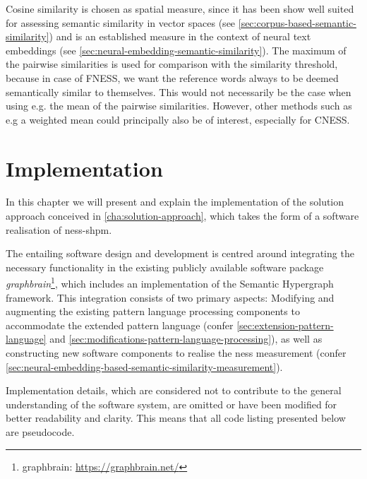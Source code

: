 \documentclass[11pt, numbers=noenddot]{scrreprt}
\begin{document}

Cosine similarity is chosen as spatial measure, since it has been show well suited for assessing semantic similarity in vector spaces (see \cref{sec:corpus-based-semantic-similarity}) and is an established measure in the context of neural text embeddings (see \cref{sec:neural-embedding-semantic-similarity}). The maximum of the pairwise similarities is used for comparison with the similarity threshold, because in case of FNESS, we want the reference words always to be deemed semantically similar to themselves. This would not necessarily be the case when using e.g. the mean of the pairwise similarities. However, other methods such as e.g a weighted mean could principally also be of interest, especially for CNESS.




\chapter{Implementation}
\label{cha:implementation}

In this chapter we will present and explain the implementation of the solution approach conceived in \cref{cha:solution-approach}, which takes the form of a software realisation of \gls{ness-shpm}.

The entailing software design and development is centred around integrating the necessary functionality in the existing publicly available software package \textit{graphbrain}\footnote{graphbrain: \url{https://graphbrain.net/}}, which includes an implementation of the Semantic Hypergraph framework. This integration consists of two primary aspects: Modifying and augmenting the existing pattern language processing components to accommodate the extended pattern language (confer \cref{sec:extension-pattern-language} and \cref{sec:modifications-pattern-language-processing}), as well as constructing new software components to realise the \gls{ness} measurement (confer \cref{sec:neural-embedding-based-semantic-similarity-measurement}).

Implementation details, which are considered not to contribute to the general understanding of the software system, are omitted or  have been modified for better readability and clarity. This means that all code listing presented below are pseudocode.
\end{document}
